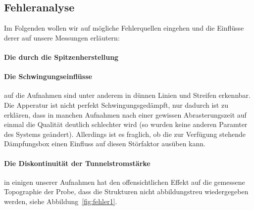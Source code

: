 \subsection{Fehleranalyse}
Im Folgenden wollen wir auf mögliche Fehlerquellen eingehen und die Einflüsse derer
auf unsere Messungen erläutern:
\paragraph{Die durch die Spitzenherstellung}
\paragraph{Die Schwingungseinflüsse} auf die Aufnahmen sind unter anderem in dünnen Linien
und Streifen erkennbar. Die Apperatur ist nicht perfekt Schwingungsgedämpft, nur dadurch
ist zu erklären, dass in manchen Aufnahmen nach einer gewissen Abrasterungszeit auf einmal
die Qualität deutlich schlechter wird (so wurden keine anderen Paramter des Systems geändert).
Allerdings ist es fraglich, ob die zur Verfügung stehende Dämpfungsbox einen Einfluss
auf diesen Störfaktor ausüben kann. 
\paragraph{Die Diskontinuität der Tunnelstromstärke} in einigen unserer Aufnahmen hat den
offensichtlichen Effekt auf die gemessene Topographie der Probe, dass die Strukturen nicht
abbildungstreu wiedergegeben werden, siehe Abbildung~\ref{fig:fehler1}. 

